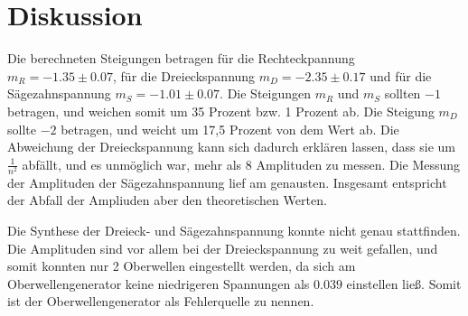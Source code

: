 \section{Diskussion}
\label{sec:Diskussion}

Die berechneten Steigungen betragen für die Rechteckpannung $m_R = -1.35 \pm 0.07$, für die
Dreieckspannung $m_D= -2.35 \pm 0.17$ und für die Sägezahnspannung $m_S= -1.01 \pm 0.07$. 
Die Steigungen $m_R$ und $m_S$ sollten $-1$ betragen, und weichen somit um 35 Prozent bzw. 1 Prozent ab. 
Die Steigung $m_D$ sollte $-2$ betragen, und weicht um 17,5 Prozent von dem Wert ab. Die Abweichung 
der Dreieckspannung kann sich dadurch erklären lassen, dass sie um $\frac{1}{n^2}$ abfällt, und es unmöglich war, mehr als 8 Amplituden zu messen.
Die Messung der Amplituden der Sägezahnspannung lief am genausten. 
Insgesamt entspricht der Abfall der Ampliuden aber den theoretischen Werten.

\noindent Die Synthese der Dreieck- und Sägezahnspannung konnte nicht genau stattfinden. 
Die Amplituden sind vor allem bei der Dreieckspannung zu weit gefallen, und somit konnten nur 2 Oberwellen eingestellt werden, da sich am Oberwellengenerator keine niedrigeren Spannungen als
$0.039$ einstellen ließ.
Somit ist der Oberwellengenerator als Fehlerquelle zu nennen.